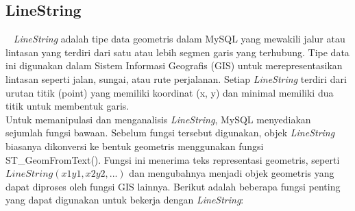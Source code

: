\subsection{LineString}
\label{subs:linestring}
~\cite{oracle:24:mysql8.4}
\textit{LineString} adalah tipe data geometris dalam MySQL yang mewakili jalur atau lintasan yang terdiri dari satu atau lebih segmen garis yang terhubung. Tipe data ini digunakan dalam Sistem Informasi Geografis (GIS) untuk merepresentasikan lintasan seperti jalan, sungai, atau rute perjalanan. Setiap \textit{LineString} terdiri dari urutan titik (point) yang memiliki koordinat (x, y) dan minimal memiliki dua titik untuk membentuk garis.
\\
Untuk memanipulasi dan menganalisis \textit{LineString}, MySQL menyediakan sejumlah fungsi bawaan. Sebelum fungsi tersebut digunakan, objek \textit{LineString} biasanya dikonversi ke bentuk geometris menggunakan fungsi ST\_GeomFromText(). Fungsi ini menerima teks representasi geometris, seperti $LineString(x1 y1, x2 y2, ...)$ dan mengubahnya menjadi objek geometris yang dapat diproses oleh fungsi GIS lainnya.
Berikut adalah beberapa fungsi penting yang dapat digunakan untuk bekerja dengan \textit{LineString}:
